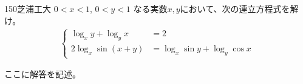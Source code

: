 \begin{prob}{150}{}{芝浦工大}
 $0<x<1$, $0<y<1$ なる実数$x, y$において、次の連立方程式を解け。
 \begin{align*}
  \left\{
  \begin{aligned}
   \log_x y+\log_y x &=2 \\
   2\log_x \sin(x+y) &= \log_x \sin y+\log_y \cos x
  \end{aligned}
  \right.
 \end{align*}
\end{prob}
ここに解答を記述。